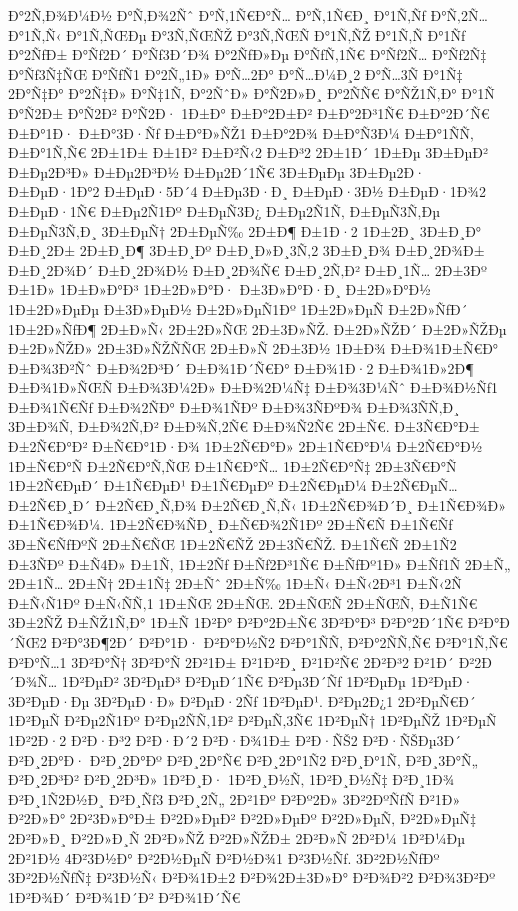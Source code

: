 {Ð°2Ñ‚Ð¾Ð¼Ð½
Ð°Ñ‚Ð¾2Ñˆ
Ð°Ñ‚1Ñ€Ð°Ñ…
Ð°Ñ‚1Ñ€Ð¸
Ð°1Ñ‚Ñƒ
Ð°Ñ‚2Ñ…
Ð°1Ñ‚Ñ‹
Ð°1Ñ‚ÑŒÐµ
Ð°3Ñ‚ÑŒÑŽ
Ð°3Ñ‚ÑŒÑ
Ð°1Ñ‚ÑŽ
Ð°1Ñ‚Ñ
Ð°1Ñƒ
Ð°2ÑƒÐ±
Ð°Ñƒ2Ð´
Ð°Ñƒ3Ð´Ð¾
Ð°2ÑƒÐ»Ðµ
Ð°ÑƒÑ‚1Ñ€
Ð°Ñƒ2Ñ…
Ð°Ñƒ2Ñ‡
Ð°Ñƒ3Ñ‡ÑŒ
Ð°ÑƒÑ1
Ð°2Ñ„1Ð»
Ð°Ñ…2Ð°
Ð°Ñ…Ð¼Ð¸2
Ð°Ñ…3Ñ
Ð°1Ñ‡
2Ð°Ñ‡Ð°
Ð°2Ñ‡Ð»
Ð°Ñ‡1Ñ‚
Ð°2ÑˆÐ»
Ð°Ñ2Ð»Ð¸
Ð°2ÑÑ€
Ð°ÑŽ1Ñ‚Ð°
Ð°1Ñ
Ð°Ñ2Ð±
Ð°Ñ2Ð²
Ð°Ñ2Ð·
1Ð±Ð°
Ð±Ð°2Ð±Ð²
Ð±Ð°2Ð³1Ñ€
Ð±Ð°2Ð´Ñ€
Ð±Ð°1Ð·
Ð±Ð°3Ð·Ñƒ
Ð±Ð°Ð»ÑŽ1
Ð±Ð°2Ð¾
Ð±Ð°Ñ3Ð¼
Ð±Ð°1ÑÑ‚
Ð±Ð°1Ñ‚Ñ€
2Ð±1Ð±
Ð±1Ð²
Ð±Ð²Ñ‹2
Ð±Ð³2
2Ð±1Ð´
1Ð±Ðµ
3Ð±ÐµÐ²
Ð±Ðµ2Ð³Ð»
Ð±Ðµ2Ð³Ð½
Ð±Ðµ2Ð´1Ñ€
3Ð±ÐµÐµ
3Ð±Ðµ2Ð·
Ð±ÐµÐ·1Ð°2
Ð±ÐµÐ·5Ð´4
Ð±Ðµ3Ð·Ð¸
Ð±ÐµÐ·3Ð½
Ð±ÐµÐ·1Ð¾2
Ð±ÐµÐ·1Ñ€
Ð±Ðµ2Ñ1Ðº
Ð±ÐµÑ3Ð¿
Ð±Ðµ2Ñ1Ñ‚
Ð±ÐµÑ3Ñ‚Ðµ
Ð±ÐµÑ3Ñ‚Ð¸
3Ð±ÐµÑ†
2Ð±ÐµÑ‰
2Ð±Ð¶
Ð±1Ð·2
1Ð±2Ð¸
3Ð±Ð¸Ð°
Ð±Ð¸2Ð±
2Ð±Ð¸Ð¶
3Ð±Ð¸Ðº
Ð±Ð¸Ð»Ð¸3Ñ‚2
3Ð±Ð¸Ð¾
Ð±Ð¸2Ð¾Ð±
Ð±Ð¸2Ð¾Ð´
Ð±Ð¸2Ð¾Ð½
Ð±Ð¸2Ð¾Ñ€
Ð±Ð¸2Ñ‚Ð²
Ð±Ð¸1Ñ…
2Ð±3Ðº
Ð±1Ð»
1Ð±Ð»Ð°Ð³
1Ð±2Ð»Ð°Ð·
Ð±3Ð»Ð°Ð·Ð¸
Ð±2Ð»Ð°Ð½
1Ð±2Ð»ÐµÐµ
Ð±3Ð»ÐµÐ½
Ð±2Ð»ÐµÑ1Ðº
1Ð±2Ð»ÐµÑ
Ð±2Ð»ÑƒÐ´
1Ð±2Ð»ÑƒÐ¶
2Ð±Ð»Ñ‹
2Ð±2Ð»ÑŒ
2Ð±3Ð»ÑŽ.
Ð±2Ð»ÑŽÐ´
Ð±2Ð»ÑŽÐµ
Ð±2Ð»ÑŽÐ»
2Ð±3Ð»ÑŽÑÑŒ
2Ð±Ð»Ñ
2Ð±3Ð½
1Ð±Ð¾
Ð±Ð¾1Ð±Ñ€Ð°
Ð±Ð¾3Ð²Ñˆ
Ð±Ð¾2Ð³Ð´
Ð±Ð¾1Ð´Ñ€Ð°
Ð±Ð¾1Ð·2
Ð±Ð¾1Ð»2Ð¶
Ð±Ð¾1Ð»ÑŒÑ
Ð±Ð¾3Ð¼2Ð»
Ð±Ð¾2Ð¼Ñ‡
Ð±Ð¾3Ð¼Ñˆ
Ð±Ð¾Ð½Ñƒ1
Ð±Ð¾1Ñ€Ñƒ
Ð±Ð¾2ÑÐ°
Ð±Ð¾1ÑÐº
Ð±Ð¾3ÑÐºÐ¾
Ð±Ð¾3ÑÑ‚Ð¸
3Ð±Ð¾Ñ‚
Ð±Ð¾2Ñ‚Ð²
Ð±Ð¾Ñ‚2Ñ€
Ð±Ð¾Ñ2Ñ€
2Ð±Ñ€.
Ð±3Ñ€Ð°Ð±
Ð±2Ñ€Ð°Ð²
Ð±Ñ€Ð°1Ð·Ð¾
1Ð±2Ñ€Ð°Ð»
2Ð±1Ñ€Ð°Ð¼
Ð±2Ñ€Ð°Ð½
1Ð±Ñ€Ð°Ñ
Ð±2Ñ€Ð°Ñ‚ÑŒ
Ð±1Ñ€Ð°Ñ…
1Ð±2Ñ€Ð°Ñ‡
2Ð±3Ñ€Ð°Ñ
1Ð±2Ñ€ÐµÐ´
Ð±1Ñ€ÐµÐ¹
Ð±1Ñ€ÐµÐº
Ð±2Ñ€ÐµÐ¼
Ð±2Ñ€ÐµÑ…
Ð±2Ñ€Ð¸Ð´
Ð±2Ñ€Ð¸Ñ‚Ð¾
Ð±2Ñ€Ð¸Ñ‚Ñ‹
1Ð±2Ñ€Ð¾Ð´Ð¸
Ð±1Ñ€Ð¾Ð»
Ð±1Ñ€Ð¾Ð¼.
1Ð±2Ñ€Ð¾ÑÐ¸
Ð±Ñ€Ð¾2Ñ1Ðº
2Ð±Ñ€Ñ
Ð±1Ñ€Ñƒ
3Ð±Ñ€ÑƒÐºÑ
2Ð±Ñ€ÑŒ
1Ð±2Ñ€ÑŽ
2Ð±3Ñ€ÑŽ.
Ð±1Ñ€Ñ
2Ð±1Ñ2
Ð±3ÑÐº
Ð±Ñ4Ð»
Ð±1Ñ‚
1Ð±2Ñƒ
Ð±Ñƒ2Ð³1Ñ€
Ð±ÑƒÐº1Ð»
Ð±Ñƒ1Ñ
2Ð±Ñ„
2Ð±1Ñ…
2Ð±Ñ†
2Ð±1Ñ‡
2Ð±Ñˆ
2Ð±Ñ‰
1Ð±Ñ‹
Ð±Ñ‹2Ð³1
Ð±Ñ‹2Ñ
Ð±Ñ‹Ñ1Ðº
Ð±Ñ‹ÑÑ‚1
1Ð±ÑŒ
2Ð±ÑŒ.
2Ð±ÑŒÑ
2Ð±ÑŒÑ‚
Ð±Ñ1Ñ€
3Ð±2ÑŽ
Ð±ÑŽ1Ñ‚Ð°
1Ð±Ñ
1Ð²Ð°
Ð²Ð°2Ð±Ñ€
3Ð²Ð°Ð³
Ð²Ð°2Ð´1Ñ€
Ð²Ð°Ð´ÑŒ2
Ð²Ð°3Ð¶2Ð´
Ð²Ð°1Ð·
Ð²Ð°Ð½Ñ2
Ð²Ð°1ÑÑ‚
Ð²Ð°2ÑÑ‚Ñ€
Ð²Ð°1Ñ‚Ñ€
Ð²Ð°Ñ…1
3Ð²Ð°Ñ†
3Ð²Ð°Ñ
2Ð²1Ð±
Ð²1Ð²Ð¸
Ð²1Ð²Ñ€
2Ð²Ð³2
Ð²1Ð´
Ð²2Ð´Ð¾Ñ…
1Ð²ÐµÐ²
3Ð²ÐµÐ³
Ð²ÐµÐ´1Ñ€
Ð²Ðµ3Ð´Ñƒ
1Ð²ÐµÐµ
1Ð²ÐµÐ·
3Ð²ÐµÐ·Ðµ
3Ð²ÐµÐ·Ð»
Ð²ÐµÐ·2Ñƒ
1Ð²ÐµÐ¹.
Ð²Ðµ2Ð¿1
2Ð²ÐµÑ€Ð´
1Ð²ÐµÑ
Ð²Ðµ2Ñ1Ðº
Ð²Ðµ2ÑÑ‚1Ð²
Ð²ÐµÑ‚3Ñ€
1Ð²ÐµÑ†
1Ð²ÐµÑŽ
1Ð²ÐµÑ
1Ð²2Ð·2
Ð²Ð·Ð³2
Ð²Ð·Ð´2
Ð²Ð·Ð¾1Ð±
Ð²Ð·ÑŠ2
Ð²Ð·ÑŠÐµ3Ð´
Ð²Ð¸2Ð°Ð·
Ð²Ð¸2Ð°Ðº
Ð²Ð¸2Ð°Ñ€
Ð²Ð¸2Ð°1Ñ2
Ð²Ð¸Ð°1Ñ‚
Ð²Ð¸3Ð°Ñ„
Ð²Ð¸2Ð³Ð²
Ð²Ð¸2Ð³Ð»
1Ð²Ð¸Ð·
1Ð²Ð¸Ð½Ñ‚
1Ð²Ð¸Ð½Ñ‡
Ð²Ð¸1Ð¾
Ð²Ð¸1Ñ2Ð½Ð¸
Ð²Ð¸Ñƒ3
Ð²Ð¸2Ñ„
2Ð²1Ðº
Ð²Ðº2Ð»
3Ð²2ÐºÑƒÑ
Ð²1Ð»
Ð²2Ð»Ð°
2Ð²3Ð»Ð°Ð±
Ð²2Ð»ÐµÐ²
Ð²2Ð»ÐµÐº
Ð²2Ð»ÐµÑ‚
Ð²2Ð»ÐµÑ‡
2Ð²Ð»Ð¸
Ð²2Ð»Ð¸Ñ
2Ð²Ð»ÑŽ
Ð²2Ð»ÑŽÐ±
2Ð²Ð»Ñ
2Ð²Ð¼
1Ð²Ð¼Ðµ
2Ð²1Ð½
4Ð²3Ð½Ð°
Ð²2Ð½ÐµÑ
Ð²Ð½Ð¾1
Ð²3Ð½Ñƒ.
3Ð²2Ð½ÑƒÐº
3Ð²2Ð½ÑƒÑ‡
Ð²3Ð½Ñ‹
Ð²Ð¾1Ð±2
Ð²Ð¾2Ð±3Ð»Ð°
Ð²Ð¾Ð²2
Ð²Ð¾3Ð²Ðº
1Ð²Ð¾Ð´
Ð²Ð¾1Ð´Ð²
Ð²Ð¾1Ð´Ñ€
}
